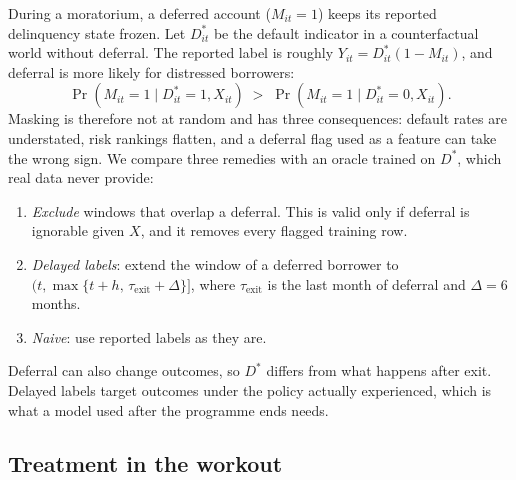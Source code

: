 \documentclass[10pt]{article}
\begin{document}
During a moratorium, a deferred account ($M_{it}=1$) keeps its reported delinquency state frozen. Let $D^{*}_{it}$ be the default indicator in a counterfactual world without deferral. The reported label is roughly $Y_{it} = D^{*}_{it}(1-M_{it})$, and deferral is more likely for distressed borrowers:
\begin{equation}\label{eq:mnar}
\Pr(M_{it}=1 \mid D^{*}_{it}=1, X_{it}) \;>\; \Pr(M_{it}=1 \mid D^{*}_{it}=0, X_{it}).
\end{equation}
Masking is therefore not at random and has three consequences: default rates are understated, risk rankings flatten, and a deferral flag used as a feature can take the wrong sign. We compare three remedies with an oracle trained on $D^{*}$, which real data never provide:
\begin{enumerate}[leftmargin=1.4em]
  \item \emph{Exclude} windows that overlap a deferral. This is valid only if deferral is ignorable given $X$, and it removes every flagged training row.
  \item \emph{Delayed labels}: extend the window of a deferred borrower to $(t, \max\{t+h,\, \tau_{\text{exit}}+\Delta\}]$, where $\tau_{\text{exit}}$ is the last month of deferral and $\Delta = 6$ months.
  \item \emph{Naive}: use reported labels as they are.
\end{enumerate}
Deferral can also change outcomes, so $D^*$ differs from what happens after exit. Delayed labels target outcomes under the policy actually experienced, which is what a model used after the programme ends needs.

\subsection{Treatment in the workout}\label{sec:treatment}
\end{document}
